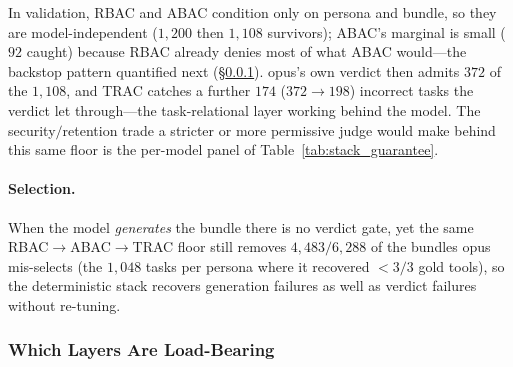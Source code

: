 \documentclass[sigconf,review,anonymous]{acmart}
\begin{document}
In validation, RBAC and ABAC condition only on persona and bundle, so they are model-independent ($1{,}200$ then $1{,}108$ survivors); ABAC's marginal is small ($92$ caught) because RBAC already denies most of what ABAC would---the backstop pattern quantified next (\S\ref{sec:reversal}). opus's own verdict then admits $372$ of the $1{,}108$, and TRAC catches a further $174$ ($372\!\to\!198$) incorrect tasks the verdict let through---the task-relational layer working behind the model. The security$/$retention trade a stricter or more permissive judge would make behind this same floor is the per-model panel of Table~\ref{tab:stack_guarantee}.

\paragraph{Selection.}
\label{sec:selection_flow}
When the model \emph{generates} the bundle there is no verdict gate, yet the same RBAC$\to$ABAC$\to$TRAC floor still removes $4{,}483/6{,}288$ of the bundles opus mis-selects (the $1{,}048$ tasks per persona where it recovered $<3/3$ gold tools), so the deterministic stack recovers generation failures as well as verdict failures without re-tuning.

\subsubsection{Which Layers Are Load-Bearing}
\label{sec:reversal}
\end{document}
